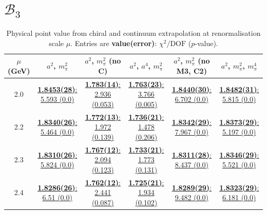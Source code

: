\documentclass[12pt]{extarticle}
\begin{document}
\section{$\mathcal{B}_3$}
\begin{table}[h!]
\begin{center}
\begin{tabular}{|c|c|c|c|c|c|}
\hline
$\mu$ (GeV) & $a^2$, $m_\pi^2$& $a^2$, $m_\pi^2$ (no C)& $a^2$, $a^4$, $m_\pi^2$& $a^2$, $m_\pi^2$ (no M3, C2)& $a^2$, $m_\pi^2$, $m_\pi^4$\\
\hline
2.0& \hyperlink{SSmPP/NPR/a2m2_20.pdf.1}{\textbf{1.8453(28)}: 5.593 (0.0)} & \hyperlink{SSmPP/NPR/a2m2noC_20.pdf.1}{\textbf{1.783(14)}: 2.936 (0.053)} & \hyperlink{SSmPP/NPR/a2a4m2_20.pdf.1}{\textbf{1.763(23)}: 3.766 (0.005)} & \hyperlink{SSmPP/NPR/a2m2mcut_20.pdf.1}{\textbf{1.8440(30)}: 6.702 (0.0)} & \hyperlink{SSmPP/NPR/a2m2m4_20.pdf.1}{\textbf{1.8482(31)}: 5.815 (0.0)}\\
2.2& \hyperlink{SSmPP/NPR/a2m2_22.pdf.1}{\textbf{1.8340(26)}: 5.464 (0.0)} & \hyperlink{SSmPP/NPR/a2m2noC_22.pdf.1}{\textbf{1.772(13)}: 1.972 (0.139)} & \hyperlink{SSmPP/NPR/a2a4m2_22.pdf.1}{\textbf{1.736(21)}: 1.478 (0.206)} & \hyperlink{SSmPP/NPR/a2m2mcut_22.pdf.1}{\textbf{1.8342(29)}: 7.967 (0.0)} & \hyperlink{SSmPP/NPR/a2m2m4_22.pdf.1}{\textbf{1.8373(29)}: 5.197 (0.0)}\\
2.3& \hyperlink{SSmPP/NPR/a2m2_23.pdf.1}{\textbf{1.8310(26)}: 5.824 (0.0)} & \hyperlink{SSmPP/NPR/a2m2noC_23.pdf.1}{\textbf{1.767(12)}: 2.094 (0.123)} & \hyperlink{SSmPP/NPR/a2a4m2_23.pdf.1}{\textbf{1.733(21)}: 1.773 (0.131)} & \hyperlink{SSmPP/NPR/a2m2mcut_23.pdf.1}{\textbf{1.8311(28)}: 8.437 (0.0)} & \hyperlink{SSmPP/NPR/a2m2m4_23.pdf.1}{\textbf{1.8346(29)}: 5.521 (0.0)}\\
2.4& \hyperlink{SSmPP/NPR/a2m2_24.pdf.1}{\textbf{1.8286(26)}: 6.51 (0.0)} & \hyperlink{SSmPP/NPR/a2m2noC_24.pdf.1}{\textbf{1.762(12)}: 2.441 (0.087)} & \hyperlink{SSmPP/NPR/a2a4m2_24.pdf.1}{\textbf{1.725(21)}: 1.934 (0.102)} & \hyperlink{SSmPP/NPR/a2m2mcut_24.pdf.1}{\textbf{1.8289(29)}: 9.482 (0.0)} & \hyperlink{SSmPP/NPR/a2m2m4_24.pdf.1}{\textbf{1.8323(29)}: 6.181 (0.0)}\\
\hline
\end{tabular}
\caption{Physical point value from chiral and continuum extrapolation at renormalisation scale $\mu$. Entries are \textbf{value(error)}: $\chi^2/\text{DOF}$ ($p$-value).}
\end{center}
\end{table}
\end{document}
